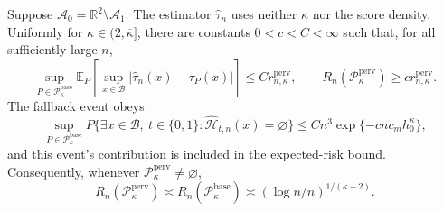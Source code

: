 Suppose \(\mathcal A_0=\mathbb R^2\setminus\mathcal A_1\). The estimator \(\widehat\tau_n\) uses neither \(\kappa\) nor the score density. Uniformly for \(\kappa\in(2,\overline\kappa]\), there are constants \(0<c<C<\infty\) such that, for all sufficiently large \(n\),
\[
 \sup_{P\in\mathcal P_{\kappa}^{\mathrm{base}}}
 \mathbb E_P\!\left[\sup_{x\in\mathcal B}|\widehat\tau_n(x)-\tau_P(x)|\right]
 \le C r_{n,\kappa}^{\mathrm{perv}},
 \qquad
 R_n(\mathcal P_{\kappa}^{\mathrm{perv}})\ge c r_{n,\kappa}^{\mathrm{perv}}.
\]
The fallback event obeys
\[
 \sup_{P\in\mathcal P_{\kappa}^{\mathrm{base}}}
 P\{\exists x\in\mathcal B,\ t\in\{0,1\}:\widehat{\mathcal H}_{t,n}(x)=\varnothing\}
 \le Cn^3\exp\{-c n c_m h_0^{\kappa}\},
\]
and this event's contribution is included in the expected-risk bound.  Consequently, whenever \(\mathcal P_{\kappa}^{\mathrm{perv}}\ne\varnothing\),
\[
 R_n(\mathcal P_{\kappa}^{\mathrm{perv}})
 \asymp R_n(\mathcal P_{\kappa}^{\mathrm{base}})
 \asymp (\log n/n)^{1/(\kappa+2)}.
\]